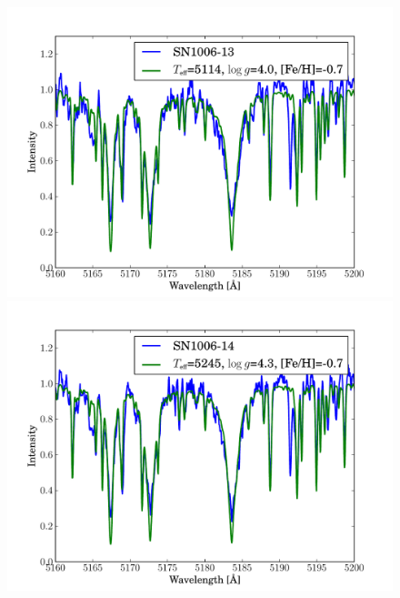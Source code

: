 \begin{figure}[tb]
   \label{fig:sn1006_candfit}
\end{figure}\begin{figure}[tb] %
   \centering
\includegraphics[width=1.1\textwidth, trim=0 0mm 0 10mm, clip]{chapter_sn1006/plots/gold_spectra/sn1006_13.pdf}
\includegraphics[width=1.1\textwidth, trim=0 0mm 0 10mm, clip]{chapter_sn1006/plots/gold_spectra/sn1006_14.pdf}


\end{figure}
